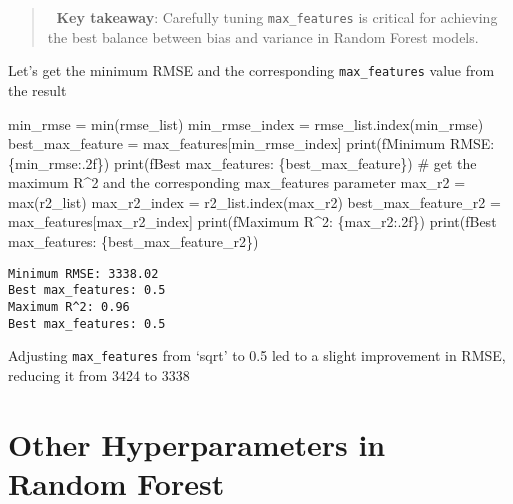 \documentclass[
  letterpaper,
  DIV=11,
  numbers=noendperiod]{scrreprt}
\newenvironment{Shaded}{\begin{snugshade}}{\end{snugshade}}
\newcommand{\BuiltInTok}[1]{\textcolor[rgb]{0.00,0.23,0.31}{#1}}
\newcommand{\CommentTok}[1]{\textcolor[rgb]{0.37,0.37,0.37}{#1}}
\newcommand{\NormalTok}[1]{\textcolor[rgb]{0.00,0.23,0.31}{#1}}
\newcommand{\OperatorTok}[1]{\textcolor[rgb]{0.37,0.37,0.37}{#1}}
\newcommand{\SpecialCharTok}[1]{\textcolor[rgb]{0.37,0.37,0.37}{#1}}
\newcommand{\SpecialStringTok}[1]{\textcolor[rgb]{0.13,0.47,0.30}{#1}}
\begin{document}
\begin{quote}
🔑 \textbf{Key takeaway}: Carefully tuning \texttt{max\_features} is
critical for achieving the best balance between bias and variance in
Random Forest models.
\end{quote}

Let's get the minimum RMSE and the corresponding \texttt{max\_features}
value from the result

\begin{Shaded}
\begin{Highlighting}[]

\NormalTok{min\_rmse }\OperatorTok{=} \BuiltInTok{min}\NormalTok{(rmse\_list)}
\NormalTok{min\_rmse\_index }\OperatorTok{=}\NormalTok{ rmse\_list.index(min\_rmse)}
\NormalTok{best\_max\_feature }\OperatorTok{=}\NormalTok{ max\_features[min\_rmse\_index]}
\BuiltInTok{print}\NormalTok{(}\SpecialStringTok{f\textquotesingle{}Minimum RMSE: }\SpecialCharTok{\{}\NormalTok{min\_rmse}\SpecialCharTok{:.2f\}}\SpecialStringTok{\textquotesingle{}}\NormalTok{)}
\BuiltInTok{print}\NormalTok{(}\SpecialStringTok{f\textquotesingle{}Best max\_features: }\SpecialCharTok{\{}\NormalTok{best\_max\_feature}\SpecialCharTok{\}}\SpecialStringTok{\textquotesingle{}}\NormalTok{)}
\CommentTok{\# get the maximum R\^{}2 and the corresponding max\_features parameter}
\NormalTok{max\_r2 }\OperatorTok{=} \BuiltInTok{max}\NormalTok{(r2\_list)}
\NormalTok{max\_r2\_index }\OperatorTok{=}\NormalTok{ r2\_list.index(max\_r2)}
\NormalTok{best\_max\_feature\_r2 }\OperatorTok{=}\NormalTok{ max\_features[max\_r2\_index]}
\BuiltInTok{print}\NormalTok{(}\SpecialStringTok{f\textquotesingle{}Maximum R\^{}2: }\SpecialCharTok{\{}\NormalTok{max\_r2}\SpecialCharTok{:.2f\}}\SpecialStringTok{\textquotesingle{}}\NormalTok{)}
\BuiltInTok{print}\NormalTok{(}\SpecialStringTok{f\textquotesingle{}Best max\_features: }\SpecialCharTok{\{}\NormalTok{best\_max\_feature\_r2}\SpecialCharTok{\}}\SpecialStringTok{\textquotesingle{}}\NormalTok{)}
\end{Highlighting}
\end{Shaded}

\begin{verbatim}
Minimum RMSE: 3338.02
Best max_features: 0.5
Maximum R^2: 0.96
Best max_features: 0.5
\end{verbatim}

Adjusting \texttt{max\_features} from `sqrt' to 0.5 led to a slight
improvement in RMSE, reducing it from 3424 to 3338

\section{Other Hyperparameters in Random
Forest}\label{other-hyperparameters-in-random-forest}
\end{document}
